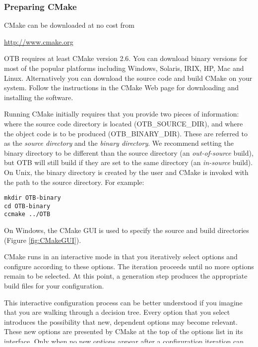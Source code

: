 \subsubsection{Preparing CMake}
\label{sec:CMakeforOTB}


CMake can be downloaded at no cost from
\begin{center}
  \url{http://www.cmake.org}
\end{center}

OTB requires at least CMake version 2.6. You can download binary
versions for most of the popular platforms including Windows, Solaris,
IRIX, HP, Mac and Linux. Alternatively you can download the source
code and build CMake on your system. Follow the instructions in the
CMake Web page for downloading and installing the software.

Running CMake initially requires that you provide two pieces of
information: where the source code directory is located
(OTB\_SOURCE\_DIR), and where the object code is to be produced
(OTB\_BINARY\_DIR). These are referred to as the \emph{source
directory} and the \emph{binary directory}. We recommend setting the
binary directory to be different than the source directory (an
\emph{out-of-source} build), but OTB will still build if they are set
to the same directory (an \emph{in-source} build).  On Unix, the
binary directory is created by the user and CMake is invoked with the
path to the source directory. For example:

\small
\begin{verbatim}
mkdir OTB-binary
cd OTB-binary
ccmake ../OTB
\end{verbatim}
\normalsize

On Windows, the CMake GUI is used to specify the source and build
directories (Figure \ref{fig:CMakeGUI}).

CMake runs in an interactive mode in that you iteratively select
options and configure according to these options. The iteration
proceeds until no more options remain to be selected. At this point, a
generation step produces the appropriate build files for your
configuration.

This interactive configuration process can be better understood if you
imagine that you are walking through a decision tree.  Every option that you
select introduces the possibility that new, dependent options may become
relevant. These new options are presented by CMake at the top of the options
list in its interface.  Only when no new options appear after a configuration
iteration can you be sure that the necessary decisions have all been made. At
this point build files are generated for the current configuration.

